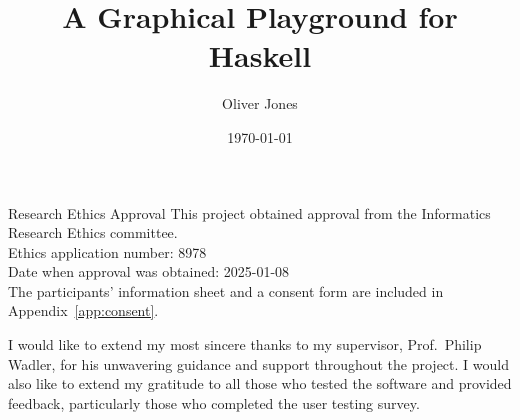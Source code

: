 \documentclass[../main.tex]{subfiles}
\begin{document}
\begin{preliminary}

    \title{A Graphical Playground for Haskell}
    \author{Oliver Jones}
    \date{\today}

    \abstract{
    }

    \maketitle

    \newenvironment{ethics}{
        \begin{frontenv}{Research Ethics Approval}{\LARGE}} {
        \end{frontenv}
        \newpage}

    \begin{ethics}
        This project obtained approval from the Informatics Research Ethics committee.
        \\
        Ethics application number: 8978
        \\
        Date when approval was obtained: 2025-01-08
        \\

        The participants' information sheet and a consent form are included in
            Appendix~\ref{app:consent}.
        \\

        \standarddeclaration
    \end{ethics}

    \begin{acknowledgements}
        I would like to extend my most sincere thanks to my supervisor, Prof.~Philip
            Wadler, for his unwavering guidance and support throughout the project.
        I would also like to extend my gratitude to all those who tested the software
            and provided feedback, particularly those who completed the user testing
            survey.
    \end{acknowledgements}

    \tableofcontents
\end{preliminary}
\end{document}
